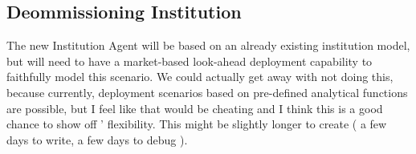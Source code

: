
\subsection{Deommissioning Institution}

The new Institution Agent will be based on an already existing institution
model, but will need to have a market-based look-ahead deployment capability to
faithfully model this scenario. We could actually get away with not doing this,
because currently, deployment scenarios based on pre-defined analytical
functions are possible, but I feel like that would be cheating and I think this
is a good chance to show off \Cyclus' flexibility. This might be slightly longer
to create ( a few days to write, a few days to debug ).
